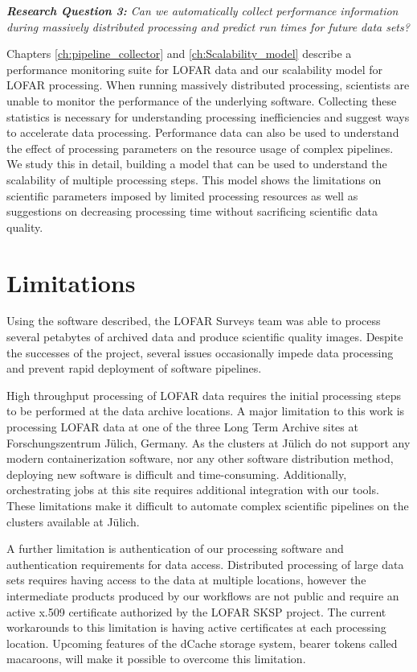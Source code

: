 \begin{addmargin}[4em]{8em}%
    \emph{\textbf{Research Question 3:} Can we automatically collect performance information during massively distributed processing and predict run times for future data sets?}
\end{addmargin}

Chapters \ref{ch:pipeline_collector} and \ref{ch:Scalability_model} describe a performance monitoring suite for LOFAR data and our scalability model for LOFAR processing. When running massively distributed processing, scientists are unable to monitor the performance of the underlying software. Collecting these statistics is necessary for understanding processing inefficiencies and suggest ways to accelerate data processing. Performance data can also be used to understand the effect of processing parameters on the resource usage of complex pipelines. We study this in detail, building a model that can be used to understand the scalability of multiple processing steps. This model shows the limitations on scientific parameters imposed by limited processing resources as well as suggestions on decreasing processing time without sacrificing scientific data quality. 

\section{Limitations}

Using the software described, the LOFAR Surveys team was able to process several petabytes of archived data and produce scientific quality images. Despite the successes of the project, several issues occasionally impede data processing and prevent rapid deployment of software pipelines.

High throughput processing of LOFAR data requires the initial processing steps to be performed at the data archive locations. A major limitation to this work is processing LOFAR data at one of the three Long Term Archive sites at Forschungszentrum J{\"u}lich, Germany. As the clusters at J{\"u}lich do not support any modern containerization software, nor any other software distribution method, deploying new software is difficult and time-consuming. Additionally, orchestrating jobs at this site requires additional integration with our tools. These limitations make it difficult to automate complex scientific pipelines on the clusters available at J{\"u}lich.

A further limitation is authentication of our processing software and authentication requirements for data access. Distributed processing of large data sets requires having access to the data at multiple locations, however the intermediate products produced by our workflows are not public and require an active x.509 certificate authorized by the LOFAR SKSP project. The current workarounds to this limitation is having active certificates at each processing location. Upcoming features of the dCache storage system, bearer tokens called macaroons, will make it possible to overcome this limitation.


